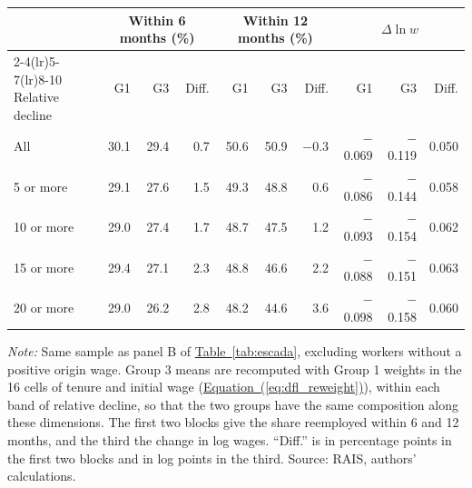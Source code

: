 {\footnotesize
\begin{threeparttable}
\begin{tabular}{lrrrrrrrrr}
\toprule
 & \multicolumn{3}{c}{Within 6 months (\%)} & \multicolumn{3}{c}{Within 12 months (\%)} & \multicolumn{3}{c}{$\Delta \ln w$} \\
\cmidrule(lr){2-4}\cmidrule(lr){5-7}\cmidrule(lr){8-10}
Relative decline & G1 & G3 & Diff. & G1 & G3 & Diff. & G1 & G3 & Diff. \\
\midrule
All & 30.1 & 29.4 & 0.7 & 50.6 & 50.9 & $-$0.3 & $-$0.069 & $-$0.119 & 0.050 \\
5 or more & 29.1 & 27.6 & 1.5 & 49.3 & 48.8 & 0.6 & $-$0.086 & $-$0.144 & 0.058 \\
10 or more & 29.0 & 27.4 & 1.7 & 48.7 & 47.5 & 1.2 & $-$0.093 & $-$0.154 & 0.062 \\
15 or more & 29.4 & 27.1 & 2.3 & 48.8 & 46.6 & 2.2 & $-$0.088 & $-$0.151 & 0.063 \\
20 or more & 29.0 & 26.2 & 2.8 & 48.2 & 44.6 & 3.6 & $-$0.098 & $-$0.158 & 0.060 \\
\bottomrule
\end{tabular}
\begin{tablenotes}[flushleft]\footnotesize
\item \textit{Note:} Same sample as panel B of \hyperref[tab:escada]{Table~\ref*{tab:escada}}, excluding workers without a positive origin wage. Group 3 means are recomputed with Group 1 weights in the 16 cells of tenure and initial wage (\hyperref[eq:dfl_reweight]{Equation~(\ref*{eq:dfl_reweight})}), within each band of relative decline, so that the two groups have the same composition along these dimensions. The first two blocks give the share reemployed within 6 and 12 months, and the third the change in log wages. ``Diff.'' is in percentage points in the first two blocks and in log points in the third. Source: RAIS, authors' calculations.
\end{tablenotes}
\end{threeparttable}
}
